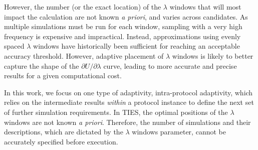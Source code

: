 However, the number (or the exact location) of the $\lambda$ windows that will 
most impact the calculation are not known \textit{a priori}, and varies across 
candidates. As multiple simulations must be run for each window, sampling with a 
very high frequency is expensive and impractical. Instead, approximations using 
evenly spaced $\lambda$ windows have historically been sufficient for reaching 
an acceptable accuracy threshold. However, adaptive placement of $\lambda$
windows is likely to better capture the shape of the 
$\partial U/\partial\lambda$ curve, leading to more accurate and precise 
results for a given computational cost.




  










In this work, we focus on one type of adaptivity, intra-protocol adaptivity, 
which relies on the intermediate results \textit{within} a protocol instance to 
define the next set of further simulation requirements. In TIES, the optimal 
positions of the $\lambda$ windows are not known \textit{a priori}. Therefore, the number of 
simulations and their descriptions, which are dictated by the $\lambda$ windows
parameter, cannot be accurately specified before execution. 

